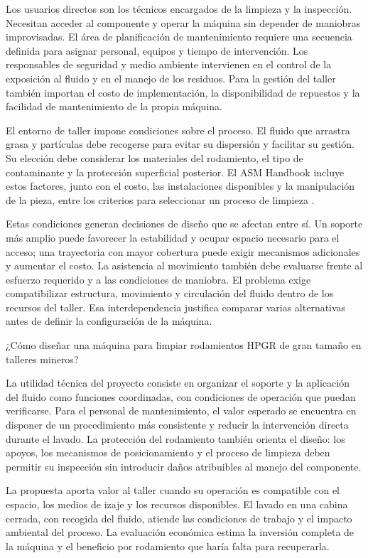 Los usuarios directos son los técnicos encargados de la limpieza y la inspección. Necesitan acceder al componente y operar la máquina sin depender de maniobras improvisadas. El área de planificación de mantenimiento requiere una secuencia definida para asignar personal, equipos y tiempo de intervención. Los responsables de seguridad y medio ambiente intervienen en el control de la exposición al fluido y en el manejo de los residuos. Para la gestión del taller también importan el costo de implementación, la disponibilidad de repuestos y la facilidad de mantenimiento de la propia máquina.

El entorno de taller impone condiciones sobre el proceso. El fluido que arrastra grasa y partículas debe recogerse para evitar su dispersión y facilitar su gestión. Su elección debe considerar los materiales del rodamiento, el tipo de contaminante y la protección superficial posterior. El ASM Handbook incluye estos factores, junto con el costo, las instalaciones disponibles y la manipulación de la pieza, entre los criterios para seleccionar un proceso de limpieza \cite{chalk1994}.

Estas condiciones generan decisiones de diseño que se afectan entre sí. Un soporte más amplio puede favorecer la estabilidad y ocupar espacio necesario para el acceso; una trayectoria con mayor cobertura puede exigir mecanismos adicionales y aumentar el costo. La asistencia al movimiento también debe evaluarse frente al esfuerzo requerido y a las condiciones de maniobra. El problema exige compatibilizar estructura, movimiento y circulación del fluido dentro de los recursos del taller. Esa interdependencia justifica comparar varias alternativas antes de definir la configuración de la máquina.

¿Cómo diseñar una máquina para limpiar rodamientos HPGR de gran tamaño en talleres mineros?

La utilidad técnica del proyecto consiste en organizar el soporte y la aplicación del fluido como funciones coordinadas, con condiciones de operación que puedan verificarse. Para el personal de mantenimiento, el valor esperado se encuentra en disponer de un procedimiento más consistente y reducir la intervención directa durante el lavado. La protección del rodamiento también orienta el diseño: los apoyos, los mecanismos de posicionamiento y el proceso de limpieza deben permitir su inspección sin introducir daños atribuibles al manejo del componente.

La propuesta aporta valor al taller cuando su operación es compatible con el espacio, los medios de izaje y los recursos disponibles. El lavado en una cabina cerrada, con recogida del fluido, atiende las condiciones de trabajo y el impacto ambiental del proceso. La evaluación económica estima la inversión completa de la máquina y el beneficio por rodamiento que haría falta para recuperarla.

